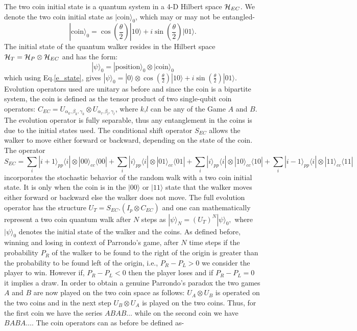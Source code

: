 \documentclass[english,aps,pra,amsmath,amssymb,showpacs,notitlepage,onecolumn]{revtex4-1}
\begin{document}
The two coin initial state is a quantum system in a 4-D Hilbert space ${\cal H}_{EC}$. We denote the two coin initial state as $|\text{coin}\rangle_0$, which may or may not be entangled-
\begin{equation}\label{e_state}
|\text{coin}\rangle_0 = \cos\left(\frac{\theta}{2}\right) |10\rangle + i \sin\left(\frac{\theta}{2}\right) |01\rangle.
\end{equation}
The initial state of the quantum walker resides in the Hilbert space ${\cal H}_T = {\cal H}_P \otimes {\cal H}_{EC}$ and has the form:
\begin{equation}
|\psi\rangle_0 = |\text{position}\rangle_0 \otimes
|\text{coin}\rangle_0
\end{equation}
which using Eq.\ref{e_state}, gives $|\psi\rangle_0 = |0\rangle \otimes \cos\left(\frac{\theta}{2}\right) |10\rangle + i \sin\left(\frac{\theta}{2}\right) |01\rangle$.
Evolution operators used are unitary as before and since the coin is a bipartite system, the coin is defined as the tensor product of two single-qubit coin operators: $C_{EC}=U_{\alpha_k,\beta_k,\gamma_k}\otimes U_{\alpha_l,\beta_l ,\gamma_l}$, where $k$,$l$ can be any of the Game $A$ and $B$. The evolution operator is fully separable, thus any entanglement in the coins is due to the initial states used. The conditional shift operator $S_{EC}$  allows the walker to move either forward or backward, 
depending on the state of the coin. The operator 
\begin{equation}\label{shift_operator_two_spins}
S_{EC} =  \sum_i |i+1 \rangle_{pp} \langle i| \otimes |00\rangle_{cc} \langle 00|  
+ \sum_i |i\rangle_{pp} \langle i| \otimes |01\rangle_{cc} \langle 01| 
+ \sum_i |i\rangle_{pp} \langle i| \otimes |10\rangle_{cc} \langle 10|
+ \sum_i |i-1 \rangle_{pp} \langle i| \otimes |11\rangle_{cc} \langle 11|
\end{equation}
incorporates the stochastic behavior of the random walk with a two coin initial state. It is only when the coin is in the $|00\rangle$ or $|11\rangle$ state that the walker moves either forward or backward else the walker does not move.
The full evolution operator has the structure $U_T = S_{EC}.(I_p \otimes  C_{EC})$ and one can mathematically represent a two coin quantum walk after $N$ steps as $|\psi \rangle_N = (U_T)^N |\psi\rangle_0,$ where $|\psi\rangle_0$ denotes the initial state of the walker and the coins. As defined before, winning and losing in context of Parrondo's game, after $N$ time steps if the probability $P_R$ of the walker to be found to the right of the origin is greater than the probability to be found left of the origin, i.e., $P_R-P_L > 0$ we consider the player to win. However if, $P_R - P_L <  0$ then the player loses and if $P_R-P_L = 0$ it implies a draw. In order to obtain a genuine Parrondo's paradox the two games $A$ and $B$ are now played on the two  coin space as follows: $U_A \otimes U_B$ is operated on the two coins and in the next step $U_B \otimes U_A$ is played on the two coins. Thus, for the first coin we have the series $ABAB\ldots$ while on the second coin we have $BABA\ldots$. The coin operators can as before be defined as-
\end{document}
